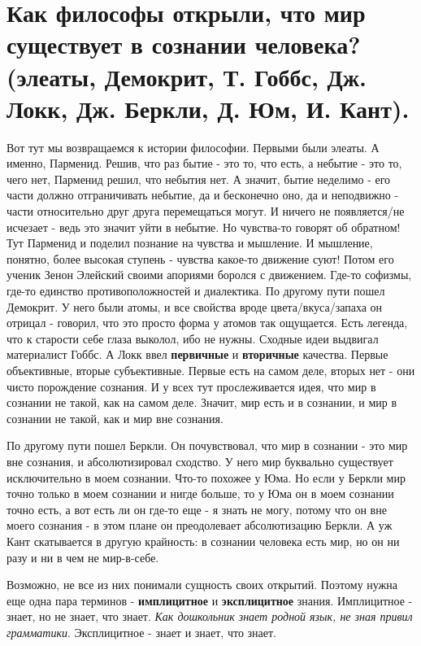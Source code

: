 \section{ Как философы открыли, что мир существует в сознании человека? (элеаты, Демокрит, Т. Гоббс, Дж. Локк, Дж. Беркли, Д. Юм, И. Кант).}
Вот тут мы возвращаемся к истории философии. Первыми были элеаты. А именно, Парменид. Решив, что раз бытие - это то, что есть, а небытие - это то, чего нет, Парменид решил, что небытия нет. А значит, бытие неделимо - его части должно отграничивать небытие, да и бесконечно оно, да и неподвижно - части относительно друг друга перемещаться могут. И ничего не появляется/не исчезает - ведь это значит уйти в небытие. Но чувства-то говорят об обратном! Тут Парменид и поделил познание на чувства и мышление. И мышление, понятно, более высокая ступень - чувства какое-то движение суют! Потом его ученик Зенон Элейский своими апориями боролся с движением. Где-то софизмы, где-то единство противоположностей и диалектика. По другому пути пошел Демокрит. У него были атомы, и все свойства вроде цвета/вкуса/запаха он отрицал - говорил, что это просто форма у атомов так ощущается. Есть легенда, что к старости себе глаза выколол, ибо не нужны. Сходные идеи выдвигал материалист Гоббс. А Локк ввел \textbf{первичные} и \textbf{вторичные} качества. Первые объективные, вторые субъективные. Первые есть на самом деле, вторых нет - они чисто порождение сознания. И у всех тут прослеживается идея, что мир в сознании не такой, как на самом деле. Значит, мир есть и в сознании, и мир в сознании не такой, как и мир вне сознания. 

По другому пути пошел Беркли. Он почувствовал, что мир в сознании - это мир вне сознания, и абсолютизировал сходство. У него мир буквально существует исключительно в моем сознании. Что-то похожее у Юма. Но если у Беркли мир точно только в моем сознании и нигде больше, то у Юма он в моем сознании точно есть, а вот есть ли он где-то еще - я знать не могу, потому что он вне моего сознания - в этом плане он преодолевает абсолютизацию Беркли. А уж Кант скатывается в другую крайность: в сознании человека есть мир, но он ни разу и ни в чем не мир-в-себе.

Возможно, не все из них понимали сущность своих открытий. Поэтому нужна еще одна пара терминов - \textbf{имплицитное} и \textbf{эксплицитное} знания. Имплицитное - знает, но не знает, что знает. \textit{Как дошкольник знает родной язык, не зная привил грамматики}. Эксплицитное - знает и знает, что знает.

